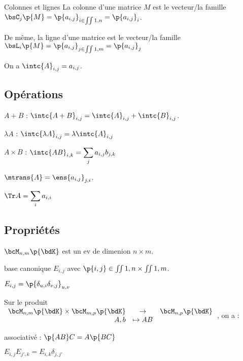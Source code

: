 \documentclass[a4paper,french,bookmarks]{book}
\begin{document}
    \begin{definition}{Colonnes et lignes}{}
        La colonne d'une matrice $M$ est le vecteur/la famille $\bsC_j\p{M} = \p{a_{i, j}}_{i \in \iint{1, n}} = \p{a_{i, j}}_i$.
        
        De même, la ligne d'une matrice est le vecteur/la famille $\bsL_i\p{M} = \p{a_{i, j}}_{j \in \iint{1, m}} = \p{a_{i, j}}_j$
    \end{definition}
    
    On a $\intc{A}_{i, j} = a_{i, j}$.
    
    \subsection{Opérations}
    
    $A + B$ : $\intc{A + B}_{i, j} = \intc{A}_{i, j} + \intc{B}_{i, j}$.
    
    $\lambda A$ : $\intc{\lambda A}_{i, j} = \lambda \intc{A}_{i, j}$
    
    $A \times B$ : $\intc{AB}_{i, k} = \displaystyle \sum_{j} a_{i, j} b_{j, k}$
    
    $\mtrans{A} = \ens{a_{i, j}}_{j, i}$.
    
    $\Tr A = \displaystyle \sum_{i} a_{i, i}$
    
    \subsection{Propriétés}
    
    $\bcM_{n, m}\p{\bdK}$ est un ev de dimenion $n \times m$.
    
    base canonique $E_{i, j}$ avec $\p{i, j} \in \iint{1, n} \times \iint{1, m}$. %
    
    $E_{i, j} = \p{\delta_{u, i}\delta_{v, j}}_{u, v}$
    
    Sur le produit $\begin{array}{rcl}
        \bcM_{n, m}\p{\bdK} \times \bcM_{m, p}\p{\bdK} &\to& \bcM_{n, p}\p{\bdK}  \\
        A, b &\mapsto AB 
    \end{array}$, on a :
    
    \begin{enumerate}
        \itt associativé : $\p{AB}C = A\p{BC}$
        
        \itt $E_{i, j}E_{j', k} = E_{i, k}\delta_{j, j'}$
    \end{enumerate}
    
\end{document}
